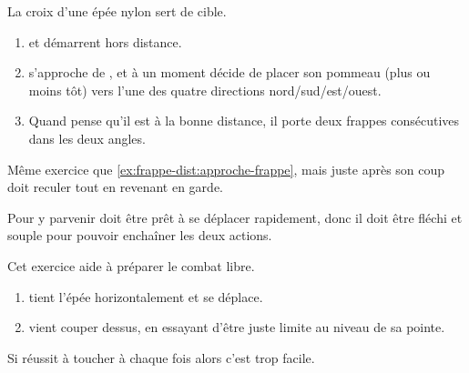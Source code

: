 \begin{exercice}
	\label{ex:frappe-dist:approche-croix-aleat}
	

	La croix d'une épée nylon sert de cible.

	\begin{enumerate}
		\item \A et \D démarrent hors distance.
		\item \D s'approche de \A, et à un moment décide de placer son pommeau (plus ou moins tôt) vers l'une des quatre directions nord/sud/est/ouest.
		\item Quand \A pense qu'il est à la bonne distance, il porte deux frappes consécutives dans les deux angles.
	\end{enumerate}

\end{exercice}


\begin{exercice}
	\label{ex:frappe-dist:approche-croix-aleat-garde}
	

	Même exercice que \ref{ex:frappe-dist:approche-frappe}, mais juste après son coup \A doit reculer tout en revenant en garde.

	Pour y parvenir \A doit être prêt à se déplacer rapidement, donc il doit être fléchi et souple pour pouvoir enchaîner les deux actions.

	Cet exercice aide à préparer le combat libre.
\end{exercice}


\begin{exercice}
	

	\begin{enumerate}
		\item \D tient l'épée horizontalement et se déplace.
		
		\item \A vient couper dessus, en essayant d'être juste limite au niveau de sa pointe.
	\end{enumerate}

	Si \A réussit à toucher à chaque fois alors c'est trop facile.

\end{exercice}


